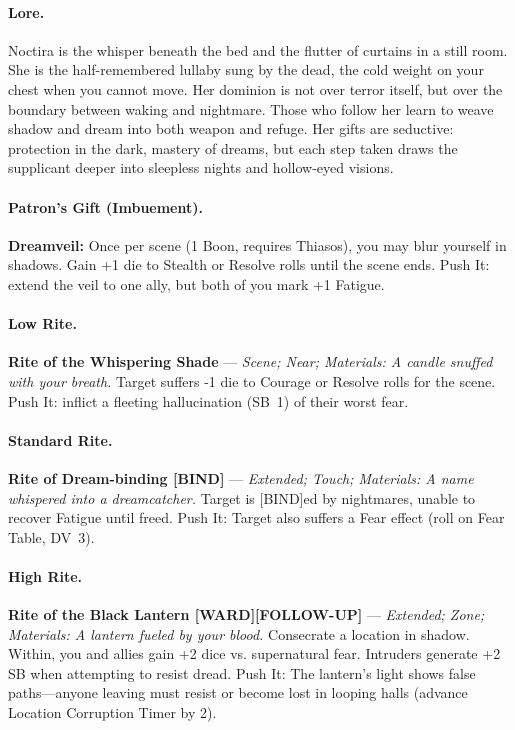 \documentclass[11pt]{article}
\begin{document}
\paragraph{Lore.}
Noctira is the whisper beneath the bed and the flutter of curtains in a still room. She is the half-remembered lullaby sung by the dead, the cold weight on your chest when you cannot move. Her dominion is not over terror itself, but over the boundary between waking and nightmare. Those who follow her learn to weave shadow and dream into both weapon and refuge. Her gifts are seductive: protection in the dark, mastery of dreams, but each step taken draws the supplicant deeper into sleepless nights and hollow-eyed visions.

\paragraph{Patron's Gift (Imbuement).}
\textbf{Dreamveil:} Once per scene (1 Boon, requires Thiasos), you may blur yourself in shadows. Gain +1 die to Stealth or Resolve rolls until the scene ends. Push It: extend the veil to one ally, but both of you mark +1 Fatigue.

\paragraph{Low Rite.}
\textbf{Rite of the Whispering Shade} --- \emph{Scene; Near; Materials: A candle snuffed with your breath.}  
Target suffers -1 die to Courage or Resolve rolls for the scene. Push It: inflict a fleeting hallucination (SB~1) of their worst fear.

\paragraph{Standard Rite.}
\textbf{Rite of Dream-binding [BIND]} --- \emph{Extended; Touch; Materials: A name whispered into a dreamcatcher.}  
Target is [BIND]ed by nightmares, unable to recover Fatigue until freed. Push It: Target also suffers a Fear effect (roll on Fear Table, DV~3).

\paragraph{High Rite.}
\textbf{Rite of the Black Lantern [WARD][FOLLOW-UP]} --- \emph{Extended; Zone; Materials: A lantern fueled by your blood.}  
Consecrate a location in shadow. Within, you and allies gain +2 dice vs. supernatural fear. Intruders generate +2 SB when attempting to resist dread. Push It: The lantern's light shows false paths---anyone leaving must resist or become lost in looping halls (advance Location Corruption Timer by 2).
\end{document}
